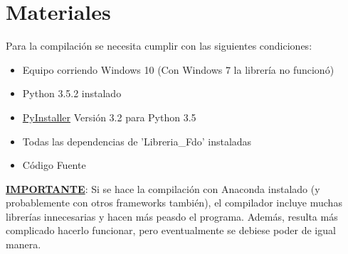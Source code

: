 \documentclass{article}
\begin{document}
\section{Materiales}
Para la compilación se necesita cumplir con las siguientes condiciones:
\begin{itemize}
\item Equipo corriendo Windows 10 (Con Windows 7 la librería no funcionó)
\item Python 3.5.2 instalado
\item \href{www.PyInstaller.org}{PyInstaller} Versión 3.2 para Python 3.5
\item Todas las dependencias de 'Libreria\_Fdo' instaladas
\item Código Fuente
\end{itemize}
\textbf{\underline{IMPORTANTE}}: Si se hace la compilación con Anaconda instalado (y probablemente con otros frameworks también), el compilador incluye muchas librerías innecesarias y hacen más peasdo el programa. Además, resulta más complicado hacerlo funcionar, pero eventualmente se debiese poder de igual manera.
\end{document}
